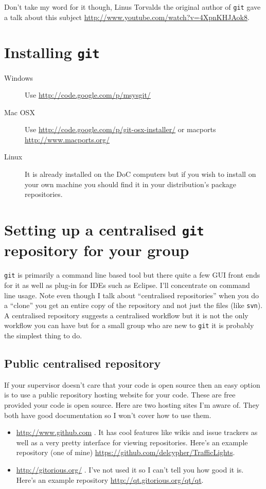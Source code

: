 \documentclass[a4paper,10pt,fleqn]{article}
\begin{document}
	Don't take my word for it though, Linus Torvalds the original author of \texttt{git} gave a talk about this subject \url{http://www.youtube.com/watch?v=4XpnKHJAok8}.

\section{Installing \texttt{git}}
	\begin{description}
	 \item[Windows] Use \url{http://code.google.com/p/msysgit/}
	 \item[Mac OSX] Use \url{http://code.google.com/p/git-osx-installer/} or macports \url{http://www.macports.org/}
	 \item[Linux] It is already installed on the DoC computers but if you wish to install on your own machine you should find it in your distribution's package repositories.	
	\end{description}


\section{Setting up a centralised \texttt{git} repository for your group}
\texttt{git} is primarily a command line based tool but there quite a few GUI front ends for it as well as plug-in for IDEs such as Eclipse. I'll concentrate on command line usage. Note even though I talk about ``centralised repositories'' when you do a ``clone'' you get an entire copy of the repository and not just the files (like \texttt{svn}). A centralised repository suggests a centralised workflow but it is not the only workflow you can have but for a small group who are new to \texttt{git} it is probably the simplest thing to do.

		\subsection{Public centralised repository}
		If your supervisor doesn't care that your code is open source then an easy option is to use a public repository hosting website for your code. These are free provided your code is open source. Here are two hosting sites I'm aware of. They both have good documentation so I won't cover how to use them.
		\begin{itemize}
			\item \url{http://www.github.com} . It has cool features like wikis and issue trackers as well as a very pretty interface for viewing repositories. Here's an example repository (one of mine) \url{https://github.com/delcypher/TrafficLights}.
			\item \url{http://gitorious.org/} . I've not used it so I can't tell you how good it is. Here's an example repository \url{http://qt.gitorious.org/qt/qt}.
		\end{itemize}
\end{document}

